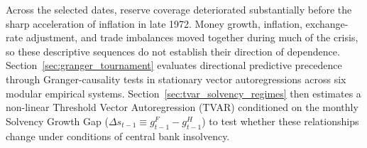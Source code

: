 Across the selected dates, reserve coverage deteriorated substantially before the sharp acceleration of inflation in late 1972. Money growth, inflation, exchange-rate adjustment, and trade imbalances moved together during much of the crisis, so these descriptive sequences do not establish their direction of dependence. Section~\ref{sec:granger_tournament} evaluates directional predictive precedence through Granger-causality tests in stationary vector autoregressions across six modular empirical systems. Section~\ref{sec:tvar_solvency_regimes} then estimates a non-linear Threshold Vector Autoregression (TVAR) conditioned on the monthly Solvency Growth Gap ($\Delta s_{t-1} \equiv g^F_{t-1} - g^H_{t-1}$) to test whether these relationships change under conditions of central bank insolvency.
